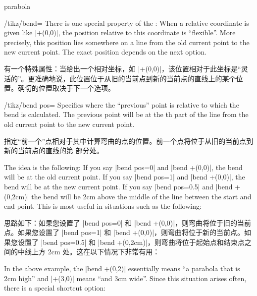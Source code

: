 \begin{pathoperation}{parabola}{}
\begin{key}{/tikz/bend=}
        There is one special property of the : When a relative
        coordinate is given like |+(0,0)|, the position relative to this
        coordinate is ``flexible''. More precisely, this position lies
        somewhere on a line from the old current point to the new current
        point. The exact position depends on the next option.

        有一个特殊属性：当给出一个相对坐标，如 |+(0,0)|，该位置相对于此坐标是“灵活的”。更准确地说，此位置位于从旧的当前点到新的当前点的直线上的某个位置。确切的位置取决于下一个选项。

    \end{key}

    \begin{key}{/tikz/bend pos=}
        Specifies where the ``previous'' point is relative to which the bend is
        calculated. The previous point will be at the th part of
        the line from the old current point to the new current point.

        指定“前一个”点相对于其中计算弯曲的点的位置。前一个点将位于从旧的当前点到新的当前点的直线的第  部分处。


        The idea is the following: If you say |bend pos=0| and |bend +(0,0)|,
        the bend will be at the old current point. If you say |bend pos=1| and
        |bend +(0,0)|, the bend will be at the new current point. If you say
        |bend pos=0.5| and |bend +(0,2cm)| the bend will be 2cm above the
        middle of the line between the start and end point. This is most useful
        in situations such as the following:

        思路如下：如果您设置了 |bend pos=0| 和 |bend +(0,0)|，则弯曲将位于旧的当前点。如果您设置了 |bend pos=1| 和 |bend +(0,0)|，则弯曲将位于新的当前点。如果您设置了 |bend pos=0.5| 和 |bend +(0,2cm)|，则弯曲将位于起始点和结束点之间的中线上方 2cm 处。这在以下情况下非常有用：

\begin{codeexample}[]
\end{codeexample}

        In the above example, the |bend +(0,2)| essentially means ``a parabola
        that is 2cm high'' and |+(3,0)| means ``and 3cm wide''. Since this
        situation arises often, there is a special shortcut option:


\end{key}
\end{pathoperation}
